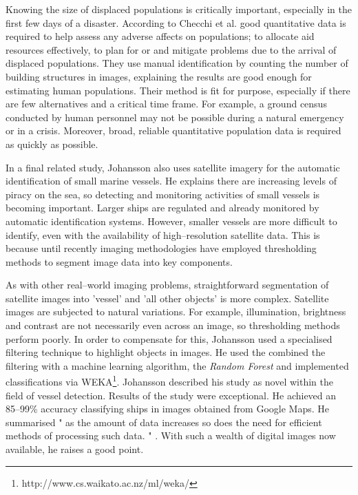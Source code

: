 Knowing the size of displaced populations is critically important, especially in the first few days of a disaster. According to Checchi et al. \cite{Checchi2013} good quantitative data is required to help assess any adverse affects on populations; to allocate aid resources effectively, to plan for or and mitigate problems due to the arrival of displaced populations. They use manual identification by counting the number of building structures in images, explaining the results are good enough for estimating human populations. Their method is fit for purpose, especially if there are few alternatives and  a critical time frame. For example, a ground census conducted by human personnel may not be possible during a natural emergency or in a crisis. Moreover, broad, reliable quantitative population data is required as quickly as possible.

In a final related study, Johansson \cite{Johansson2011} also uses satellite imagery for the automatic identification of small marine vessels.  He explains there are increasing levels of piracy on the sea, so detecting and monitoring activities of small vessels is becoming important. Larger ships are regulated and already monitored by automatic identification systems. However, smaller vessels are more difficult to identify, even with the availability of high--resolution satellite data. This is because until recently imaging methodologies have employed thresholding methods to segment image data into key components. 

As with other real--world imaging problems, straightforward segmentation of satellite images into 'vessel' and 'all other objects' is more complex. Satellite images are subjected to natural variations. For example, illumination, brightness and contrast are not necessarily even across an image, so thresholding methods perform poorly. In order to compensate for this, Johansson \cite{Johansson2011} used a specialised filtering technique to highlight objects in images. He used the combined the filtering with a machine learning algorithm, the \emph{Random Forest} and implemented classifications via WEKA\footnote{{http://www.cs.waikato.ac.nz/ml/weka/}}. Johansson \cite{Johansson2011} described his study as novel within the field of vessel detection. Results of the study were exceptional. He achieved an 85--99\% accuracy classifying ships in images obtained from Google Maps. He summarised " as the amount of data increases so does the need for efficient methods of processing such data. " \cite[pg. 1]{Johansson2011}. With such a wealth of digital images now available, he raises a good point.

